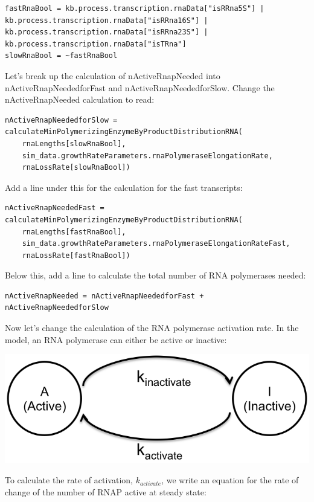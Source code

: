 \documentclass[12pt]{article}
\begin{document}
\lstset{language=Python}
\begin{lstlisting}
fastRnaBool = kb.process.transcription.rnaData["isRRna5S"] | kb.process.transcription.rnaData["isRRna16S"] | kb.process.transcription.rnaData["isRRna23S"] | kb.process.transcription.rnaData["isTRna"]
slowRnaBool = ~fastRnaBool
\end{lstlisting}

Let’s break up the calculation of nActiveRnapNeeded into nActiveRnapNeededforFast and nActiveRnapNeededforSlow. Change the nActiveRnapNeeded calculation to read:

\begin{lstlisting}
nActiveRnapNeededforSlow = calculateMinPolymerizingEnzymeByProductDistributionRNA(
    rnaLengths[slowRnaBool], 
    sim_data.growthRateParameters.rnaPolymeraseElongationRate, 
    rnaLossRate[slowRnaBool])
\end{lstlisting}

Add a line under this for the calculation for the fast transcripts:

\begin{lstlisting}
nActiveRnapNeededFast = calculateMinPolymerizingEnzymeByProductDistributionRNA(
    rnaLengths[fastRnaBool], 
    sim_data.growthRateParameters.rnaPolymeraseElongationRateFast, 
    rnaLossRate[fastRnaBool])
\end{lstlisting}

Below this, add a line to calculate the total number of RNA polymerases needed:

\begin{lstlisting}
nActiveRnapNeeded = nActiveRnapNeededforFast + nActiveRnapNeededforSlow
\end{lstlisting}

Now let’s change the calculation of the RNA polymerase activation rate. In the model, an RNA polymerase can either be active or inactive:

\includegraphics{img.png}


To calculate the rate of activation, $k_{activate}$, we write an equation for the rate of change of the number of RNAP active at steady state:
\end{document}
